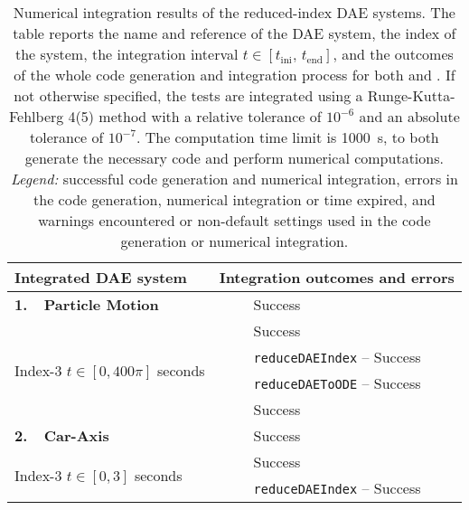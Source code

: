 \setlength\tabcolsep{2.5pt}
\setlength{\LTcapwidth}{\textwidth}
{\footnotesize\centering\begin{longtable}{lccl}
  \caption{Numerical integration results of the reduced-index \ac{DAE} systems. The table reports the name and reference of the \ac{DAE} system, the index of the system, the integration interval $t \in [t_{\text{ini}}, \, t_{\text{end}}]$, and the outcomes of the whole code generation and integration process for both \Maple{} and \Indigo{}. If not otherwise specified, the tests are integrated using a Runge-Kutta-Fehlberg 4(5) method with a relative tolerance of $10^{-6}$ and an absolute tolerance of $10^{-7}$. The computation time limit is \SI{1000}{\second}, to both generate the necessary code and perform numerical computations. \emph{Legend:} \mycheckmark{} successful code generation and numerical integration, \mycrossmark{} errors in the code generation, numerical integration or time expired, and \mywarnmark{} warnings encountered or non-default settings used in the code generation or numerical integration.}
  \label{chap4:tab:numerical_integration}
  \endfirsthead
  \endhead
  \toprule
  \textbf{Integrated \ac{DAE} system} &
  \multicolumn{3}{l}{\textbf{Integration outcomes and errors}} \\
  \midrule
  \multirow{1}{*}{\textbf{1.~~Particle Motion~\cite{campbell1995constraint}}}
    & \Maple{}       & \mycheckmark{}\phantom{\mywarnmark{}} & Success \\ \cmidrule{2-4}
    \multirow{4}{*}{Index-3 \quad $t \in [0, 400\pi]$ seconds} & \Mathematica{} & \mycheckmark{}\phantom{\mywarnmark{}} & Success \\ \cmidrule{2-4}
    & \multirow{2}{*}{\Matlab{}} & \mycheckmark{}\phantom{\mywarnmark{}} & \texttt{reduceDAEIndex} -- Success \\ \cmidrule{3-4}
    &                            & \mycheckmark{}\phantom{\mywarnmark{}} & \texttt{reduceDAEToODE} -- Success \\ \cmidrule{2-4}\cmidrule{2-4}
    & \Indigo{} & \mycheckmark{}\phantom{\mywarnmark{}} & Success \\ \midrule
  \multirow{1}{*}{\textbf{2.~~Car-Axis~\cite{lioen1998test, mazzia2008test}}}
    & \Maple{}       & \mycheckmark{}\phantom{\mywarnmark{}} & Success \\ \cmidrule{2-4}
    \multirow{4}{*}{Index-3 \quad $t \in [0, 3]$ seconds} & \Mathematica{} & \mycheckmark{}\phantom{\mywarnmark{}} & Success \\ \cmidrule{2-4}
    & \multirow{2}{*}{\Matlab{}} & \mycheckmark{}\phantom{\mywarnmark{}} & \texttt{reduceDAEIndex} -- Success \\ \cmidrule{3-4}

\end{longtable}}
